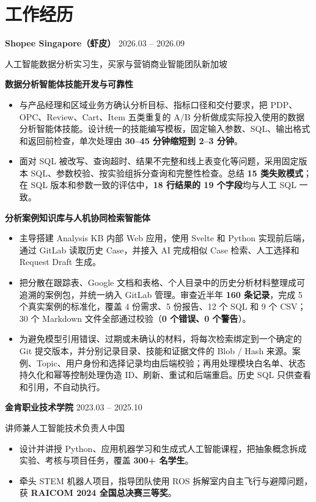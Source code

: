 \documentclass[a4paper,10pt]{article}
\newcommand{\resumeEntry}[4]{%
  {\fontsize{10.3}{12.1}\selectfont\bfseries #1}%
  \hfill{\fontsize{9.1}{11.1}\selectfont\color{muted}#2}\par
  {\fontsize{9.2}{11.3}\selectfont\color{muted}#3\hfill#4}\par\vspace{-0.5pt}
}
\newcommand{\roleProject}[2]{%
  \par\addvspace{3.8pt}%
  \noindent\hspace*{0.8em}%
  {\fontsize{10}{12}\selectfont\bfseries\color{project}#1}%
  \if\relax\detokenize{#2}\relax\else
    \hspace{0.55em}{\fontsize{9}{10.4}\selectfont\color{muted}（#2）}%
  \fi
  \par\vspace{0.7pt}
}
\newenvironment{roleItems}
  {\begin{itemize}[leftmargin=1.75em,labelsep=0.48em,itemsep=2pt,topsep=1.3pt,parsep=0pt,partopsep=0pt]}
  {\end{itemize}}
\begin{document}
\section{工作经历}
\resumeEntry
  {Shopee Singapore（虾皮）}
  {2026.03 -- 2026.09}
  {人工智能数据分析实习生，买家与营销商业智能团队}
  {新加坡}
\roleProject{数据分析智能体技能开发与可靠性}{}
\begin{roleItems}
  \item 与产品经理和区域业务方确认分析目标、指标口径和交付要求，把 PDP、OPC、Review、Cart、Item 五类重复的 A/B 分析做成实际投入使用的数据分析智能体技能。设计统一的技能编写模板，固定输入参数、SQL、输出格式和返回前检查，单次处理由 \textbf{30--45 分钟缩短到 2--3 分钟}。
  \item 面对 SQL 被改写、查询超时、结果不完整和线上表变化等问题，采用固定版本 SQL、参数校验、按实验组拆分查询和完整性检查。总结 \textbf{15 类失败模式}；在 SQL 版本和参数一致的评估中，\textbf{18 行结果的 19 个字段}均与人工 SQL 一致。
\end{roleItems}
\roleProject{分析案例知识库与人机协同检索智能体}{内部试点}
\begin{roleItems}
  \item 主导搭建 Analysis KB 内部 Web 应用，使用 Svelte 和 Python 实现前后端，通过 GitLab 读取历史 Case，并接入 AI 完成相似 Case 检索、人工选择和 Request Draft 生成。
  \item 把分散在跟踪表、Google 文档和表格、个人目录中的历史分析材料整理成可追溯的案例包，并统一纳入 GitLab 管理。审查近半年 \textbf{160 条记录}，完成 5 个真实案例的标准化，覆盖 4 份需求、5 份报告、12 个 SQL 和 9 个 CSV；30 个 Markdown 文件全部通过校验（\textbf{0 个错误、0 个警告}）。
  \item 为避免模型引用错误、过期或未确认的材料，将每次检索绑定到一个确定的 Git 提交版本，并分别记录目录、技能和证据文件的 Blob / Hash 来源。案例、Topic、用户身份和选择记录均由后端校验；再用处理模块白名单、状态持久化和幂等控制处理伪造 ID、刷新、重试和后端重启。历史 SQL 只供查看和引用，不自动执行。
\end{roleItems}

\resumeEntry
  {金肯职业技术学院}
  {2023.03 -- 2025.10}
  {讲师兼人工智能技术负责人}
  {中国}
\begin{itemize}
  \item 设计并讲授 Python、应用机器学习和生成式人工智能课程，把抽象概念拆成实验、考核与项目任务，覆盖 \textbf{300+ 名学生}。
  \item 牵头 STEM 机器人项目，指导团队使用 ROS 拆解室内自主飞行与避障问题，获 \textbf{RAICOM 2024 全国总决赛三等奖}。
\end{itemize}
\end{document}

